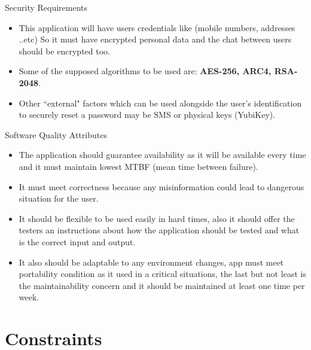 \documentclass{beamer}
\begin{document}
\begin{frame}{Security Requirements}
    
\begin{itemize}
    \item<1-> This application will have users credentials like (mobile numbers, addresses ..etc)
So it must have encrypted personal data and the chat between users should be encrypted too.

    \item<2-> Some of the supposed algorithms to be used are: \textbf{AES-256, ARC4, RSA-2048}.


    \item<3-> Other ``external" factors which can be used alongside the user’s identification to securely reset a password may be SMS or physical keys (YubiKey).
    \end{itemize}
\end{frame}


\begin{frame}{Software Quality Attributes}
    \begin{itemize}
    \item<1-> The application should guarantee availability as it will be available every time and it must maintain lowest MTBF (mean time between failure).
    
    \item<2-> It must meet correctness because any misinformation could lead to dangerous situation for the user. 
    \item<3-> It should be flexible to be used easily in hard times, also it should offer the testers an instructions about how the application should be tested and what is the correct input and output.
    
    \item<4-> It also should be adaptable to any environment changes, app must meet portability condition as it used in a critical situations, the last but not least is the maintainability concern and it should be maintained at least one time per week.
    \end{itemize}
\end{frame}


\section{Constraints}

\end{document}
